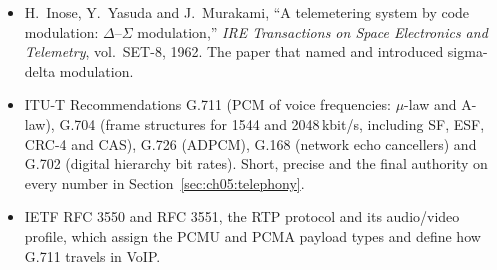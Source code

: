 \begin{itemize}
\item H.~Inose, Y.~Yasuda and J.~Murakami, ``A telemetering system by code modulation:
$\Delta$--$\Sigma$ modulation,'' \emph{IRE Transactions on Space Electronics and Telemetry},
vol.~SET-8, 1962. The paper that named and introduced sigma-delta modulation.
\item ITU-T Recommendations G.711 (PCM of voice frequencies: $\mu$-law and A-law), G.704 (frame
structures for 1544 and 2048\,kbit/s, including SF, ESF, CRC-4 and CAS), G.726 (ADPCM), G.168
(network echo cancellers) and G.702 (digital hierarchy bit rates). Short, precise and the final
authority on every number in Section~\ref{sec:ch05:telephony}.
\item IETF RFC 3550 and RFC 3551, the RTP protocol and its audio/video profile, which assign the
PCMU and PCMA payload types and define how G.711 travels in VoIP.
\end{itemize}
